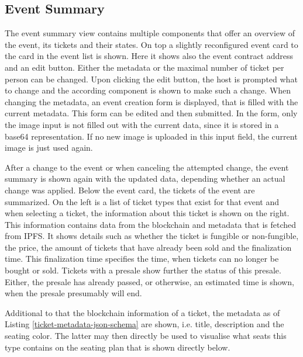 \subsection{Event Summary}
The event summary view contains multiple components that offer an overview of the event, its tickets and their states. On top a slightly reconfigured event card to the card in the event list is shown. Here it shows also the event contract address and an edit button. Either the metadata or the maximal number of ticket per person can be changed. Upon clicking the edit button, the host is prompted what to change and the according component is shown to make such a change. When changing the metadata, an event creation form is displayed, that is filled with the current metadata. This form can be edited and then submitted. In the form, only the image input is not filled out with the current data, since it is stored in a base64 representation. If no new image is uploaded in this input field, the current image is just used again.

After a change to the event or when canceling the attempted change, the event summary is shown again with the updated data, depending whether an actual change was applied. Below the event card, the tickets of the event are summarized. On the left is a list of ticket types that exist for that event and when selecting a ticket, the information about this ticket is shown on the right. This information contains data from the blockchain and metadata that is fetched from IPFS. It shows details such as whether the ticket is fungible or non-fungible, the price, the amount of tickets that have already been sold and the finalization time. This finalization time specifies the time, when tickets can no longer be bought or sold.
Tickets with a presale show further the status of this presale. Either, the presale has already passed, or otherwise, an estimated time is shown, when the presale presumably will end.

Additional to that the blockchain information of a ticket, the metadata as of Listing \ref{ticket-metadata-json-schema} are shown, i.e. title, description and the seating color. The latter may then directly be used to visualise what seats this type contains on the seating plan that is shown directly below.

